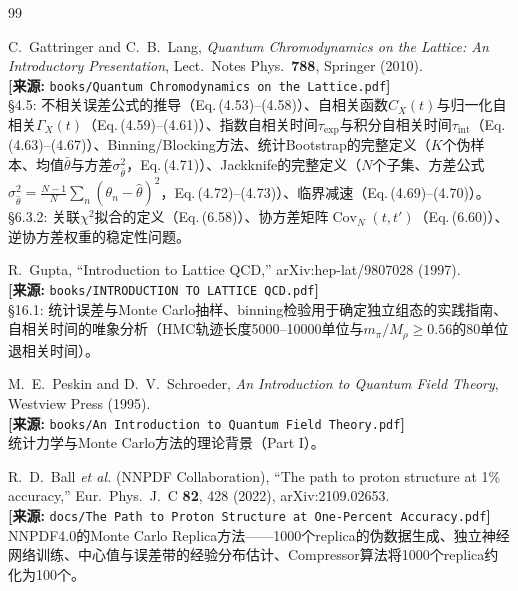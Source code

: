 \documentclass[12pt,a4paper]{ctexart}
\theoremstyle{definition}
\begin{document}
\begin{thebibliography}{99}

C.~Gattringer and C.~B.~Lang,
\textit{Quantum Chromodynamics on the Lattice: An Introductory Presentation},
Lect.\ Notes Phys.\ \textbf{788}, Springer (2010).
\\\textbf{[来源:} \texttt{books/Quantum Chromodynamics on the Lattice.pdf}\textbf{]}
\\§4.5: 不相关误差公式的推导（Eq.\,(4.53)--(4.58)）、自相关函数$C_X(t)$与归一化自相关$\Gamma_X(t)$（Eq.\,(4.59)--(4.61)）、指数自相关时间$\tau_{\text{exp}}$与积分自相关时间$\tau_{\text{int}}$（Eq.\,(4.63)--(4.67)）、Binning/Blocking方法、统计Bootstrap的完整定义（$K$个伪样本、均值$\bar\theta$与方差$\sigma_{\bar\theta}^2$，Eq.\,(4.71)）、Jackknife的完整定义（$N$个子集、方差公式$\sigma^2_{\hat\theta} = \frac{N-1}{N}\sum_n(\theta_n-\hat\theta)^2$，Eq.\,(4.72)--(4.73)）、临界减速（Eq.\,(4.69)--(4.70)）。§6.3.2: 关联$\chi^2$拟合的定义（Eq.\,(6.58)）、协方差矩阵$\operatorname{Cov}_N(t,t')$（Eq.\,(6.60)）、逆协方差权重的稳定性问题。

R.~Gupta,
``Introduction to Lattice QCD,''
arXiv:hep-lat/9807028 (1997).
\\\textbf{[来源:} \texttt{books/INTRODUCTION TO LATTICE QCD.pdf}\textbf{]}
\\§16.1: 统计误差与Monte Carlo抽样、binning检验用于确定独立组态的实践指南、自相关时间的唯象分析（HMC轨迹长度5000--10000单位与$m_\pi/M_\rho \ge 0.56$的80单位退相关时间）。

M.~E.~Peskin and D.~V.~Schroeder,
\textit{An Introduction to Quantum Field Theory},
Westview Press (1995).
\\\textbf{[来源:} \texttt{books/An Introduction to Quantum Field Theory.pdf}\textbf{]}
\\统计力学与Monte Carlo方法的理论背景（Part I）。

R.~D.~Ball \textit{et al.} (NNPDF Collaboration),
``The path to proton structure at 1\% accuracy,''
Eur.\ Phys.\ J.\ C \textbf{82}, 428 (2022), arXiv:2109.02653.
\\\textbf{[来源:} \texttt{docs/The Path to Proton Structure at One-Percent Accuracy.pdf}\textbf{]}
\\NNPDF4.0的Monte Carlo Replica方法——1000个replica的伪数据生成、独立神经网络训练、中心值与误差带的经验分布估计、Compressor算法将1000个replica约化为100个。


\end{thebibliography}
\end{document}
